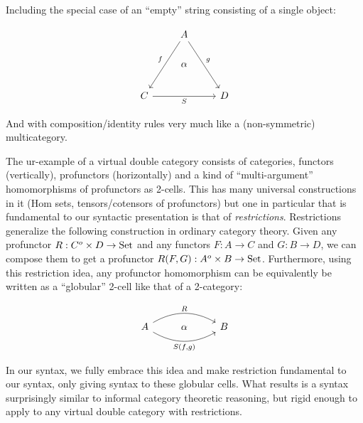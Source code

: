 \documentclass{article}
\begin{document}
Including the special case of an ``empty'' string consisting of a
single object:

\[%
\begin{tikzcd}
                   & A \arrow[rdd, "g"] \arrow[ldd, "f"'] &   \\
                   & \alpha                               &   \\
C \arrow[rr, "S"'] &                                      & D
\end{tikzcd}\]

And with composition/identity rules very much like a (non-symmetric)
multicategory.

The ur-example of a virtual double category consists of categories,
functors (vertically), profunctors (horizontally) and a kind of
``multi-argument'' homomorphisms of profunctors as 2-cells. This has
many universal constructions in it (Hom sets, tensors/cotensors of
profunctors) but one in particular that is fundamental to our
syntactic presentation is that of \emph{restrictions}. Restrictions
generalize the following construction in ordinary category
theory. Given any profunctor $R : C^o \times D \to \textrm{Set}$ and any
functors $F : A \to C$ and $G : B \to D$, we can compose them to get a
profunctor $R(F,G) : A^o \times B \to \textrm{Set}$. Furthermore, using this
restriction idea, any profunctor homomorphism can be equivalently be
written as a ``globular'' 2-cell like that of a 2-category:

\[%
\begin{tikzcd}
A \arrow[rr, "R", bend left] \arrow[rr, "{S(f,g)}"', bend right] & \alpha & B
\end{tikzcd}\]

In our syntax, we fully embrace this idea and make restriction
fundamental to our syntax, only giving syntax to these globular
cells. What results is a syntax surprisingly similar to informal
category theoretic reasoning, but rigid enough to apply to any virtual
double category with restrictions.
\end{document}
